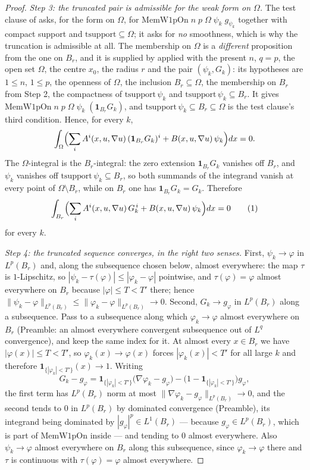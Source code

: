 \begin{proof}
\emph{Step 3: the truncated pair is admissible for the weak form on $\Omega$.}
The test clause of  asks, for the form on $\Omega$,
for $\mathrm{MemW1pOn}\;n\;p\;\Omega\;\psi_k\;g_{\psi_k}$ together with compact
support and $\mathrm{tsupport}\subseteq\Omega$; it asks for \emph{no}
smoothness, which is why the truncation is admissible at all.  The membership on
$\Omega$ is a \emph{different} proposition from the one on $B_r$, and it is
supplied by  applied with the present $n$,
$q=p$, the open set $\Omega$, the centre $x_0$, the radius $r$ and the pair
$(\psi_k,G_k)$: its hypotheses are $1\le n$, $1\le p$, the openness of $\Omega$,
the inclusion $B_r\subseteq\Omega$, the membership on $B_r$ from Step 2, the
compactness of $\mathrm{tsupport}\,\psi_k$ and
$\mathrm{tsupport}\,\psi_k\subseteq B_r$.  It gives
$\mathrm{MemW1pOn}\;n\;p\;\Omega\;\psi_k\;(\mathbf1_{B_r}G_k)$, and
$\mathrm{tsupport}\,\psi_k\subseteq B_r\subseteq\Omega$ is the test clause's
third condition.  Hence, for every $k$,
\[
\int_\Omega\Bigl(\sum_iA^i(x,u,\nabla u)\,(\mathbf1_{B_r}G_k)^i
+B(x,u,\nabla u)\,\psi_k\Bigr)dx=0 .
\]
The $\Omega$-integral is the $B_r$-integral: the zero extension
$\mathbf1_{B_r}G_k$ vanishes off $B_r$, and $\psi_k$ vanishes off
$\mathrm{tsupport}\,\psi_k\subseteq B_r$, so both summands of the integrand
vanish at every point of $\Omega\setminus B_r$, while on $B_r$ one has
$\mathbf1_{B_r}G_k=G_k$.  Therefore
\[
\int_{B_r}\Bigl(\sum_iA^i(x,u,\nabla u)\,G_k^{\,i}
+B(x,u,\nabla u)\,\psi_k\Bigr)dx=0
\tag{1}
\]
for every $k$.

\emph{Step 4: the truncated sequence converges, in the right two senses.}
First, $\psi_k\to\varphi$ in $L^p(B_r)$ and, along the subsequence chosen below,
almost everywhere: the map $\tau$ is $1$-Lipschitz, so
$|\psi_k-\tau(\varphi)|\le|\varphi_k-\varphi|$ pointwise, and
$\tau(\varphi)=\varphi$ almost everywhere on $B_r$ because $|\varphi|\le T<T'$
there; hence
$\|\psi_k-\varphi\|_{L^p(B_r)}\le\|\varphi_k-\varphi\|_{L^p(B_r)}\to0$.
Second, $G_k\to g_\varphi$ in $L^p(B_r)$ along a subsequence.  Pass to a
subsequence along which $\varphi_k\to\varphi$ almost everywhere on $B_r$
(Preamble: an almost everywhere convergent subsequence out of $L^q$
convergence), and keep the same index for it.  At almost every $x\in B_r$ we
have $|\varphi(x)|\le T<T'$, so $\varphi_k(x)\to\varphi(x)$ forces
$|\varphi_k(x)|<T'$ for all large $k$ and therefore
$\mathbf1_{\{|\varphi_k|<T'\}}(x)\to1$.  Writing
\[
G_k-g_\varphi
=\mathbf1_{\{|\varphi_k|<T'\}}\bigl(\nabla\varphi_k-g_\varphi\bigr)
-\bigl(1-\mathbf1_{\{|\varphi_k|<T'\}}\bigr)g_\varphi ,
\]
the first term has $L^p(B_r)$ norm at most
$\|\nabla\varphi_k-g_\varphi\|_{L^p(B_r)}\to0$, and the second tends to $0$ in
$L^p(B_r)$ by dominated convergence (Preamble), its integrand being dominated by
$|g_\varphi|^p\in L^1(B_r)$ --- because $g_\varphi\in L^p(B_r)$, which is part
of $\mathrm{MemW1pOn}$ inside  --- and tending to $0$
almost everywhere.  Also $\psi_k\to\varphi$ almost everywhere on $B_r$ along
this subsequence, since $\varphi_k\to\varphi$ there and $\tau$ is continuous
with $\tau(\varphi)=\varphi$ almost everywhere.


\end{proof}
